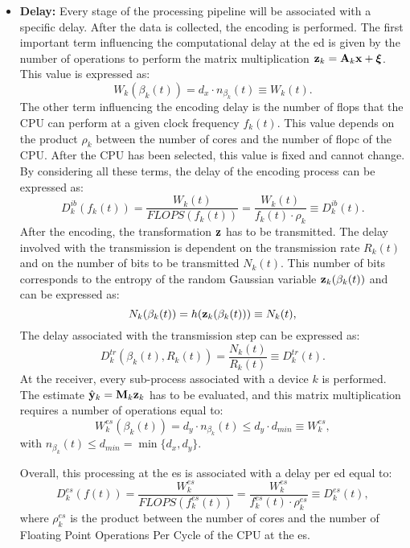 \begin{itemize}[label={}]
    \item {\textbf{Delay:}}
    Every stage of the processing pipeline will be associated with a specific delay. After the data is collected, the encoding is performed. The first important term influencing the computational delay at the \gls{ed} is given by the number of operations to perform the matrix multiplication $\mathbf{z}_k = \mathbf{A}_k \mathbf{x} + \boldsymbol{\xi}$. This value is expressed as:
    \begin{equation}
        W_k(\beta_k(t)) = d_x\cdot n_{\beta_k}(t) \equiv W_k(t).
    \end{equation}
    The other term influencing the encoding delay is the number of \gls{flops} that the CPU can perform at a given clock frequency $f_k(t)$. This value depends on the product $\rho_k$ between the number of cores and the number of \gls{flopc} of the CPU. After the CPU has been selected, this value is fixed and cannot change. By considering all these terms, the delay of the encoding process can be expressed as:
    \begin{equation}
        D_k^{ib}(f_k(t)) = \frac{W_k(t)}{FLOPS(f_k(t))} = \frac{W_k(t)}{f_k(t) \cdot \rho_k} \equiv D_k^{ib}(t).
    \end{equation}
    After the encoding, the transformation $\mathbf{z}$ has to be transmitted. The delay involved with the transmission is dependent on the transmission rate $R_k(t)$ and on the number of bits to be transmitted $N_k(t)$. This number of bits corresponds to the entropy of the random Gaussian variable $\mathbf{z}_k(\beta_k(t))$ and can be expressed as:
    \begin{equation}
        N_k(\beta_k(t)) = h(\mathbf{z}_k(\beta_k(t)))  \equiv N_k(t),
    \end{equation}
    The delay associated with the transmission step can be expressed as:
    \begin{equation}
        D_k^{tr}(\beta_k(t), R_k(t)) = \frac{N_k(t)}{R_k(t)} \equiv D_k^{tr}(t).
    \end{equation}
    At the receiver, every sub-process associated with a device $k$ is performed. The estimate $\hat{\mathbf{y}}_k=\mathbf{M}_k\mathbf{z}_k$ has to be evaluated, and this matrix multiplication requires a number of operations equal to:
    \begin{equation}
        W_k^{es}(\beta_k(t)) = d_y\cdot n_{\beta_k}(t) \leq  d_y \cdot d_{min} \equiv W_k^{es},
    \end{equation}
    with $n_{\beta_k}(t)\leq d_{min}= \min\{ d_x, d_y\}$.
    
    Overall, this processing at the \gls{es} is associated with a delay per \gls{ed} equal to:
    \begin{equation}
        D_k^{es}(f(t)) = \frac{W_k^{es}}{FLOPS(f_k^{es}(t))} = \frac{W_k^{es}}{f_k^{es}(t) \cdot \rho_k^{es}} \equiv D_k^{es}(t),
    \end{equation}
    where $\rho_k^{es}$ is the product between the number of cores and the number of Floating Point Operations Per Cycle of the CPU at the \gls{es}.


\end{itemize}

